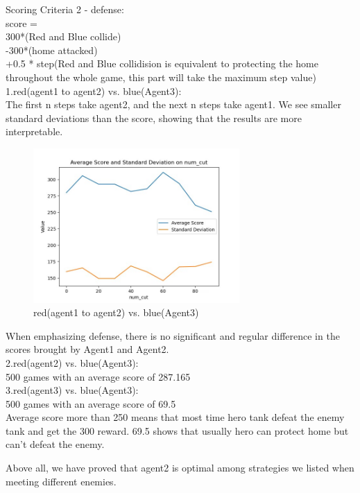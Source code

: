 \documentclass{article}
\begin{document}
Scoring Criteria 2 - defense:\\
score =\\
300*(Red and Blue collide)\\
-300*(home attacked)\\
+0.5 * step(Red and Blue collidision is equivalent to protecting the home throughout the whole game, this part will take the maximum step value) \\

1.red(agent1 to agent2) vs. blue(Agent3):\\
The first n steps take agent2, and the next n steps take agent1. We see smaller standard deviations than the score, showing that the results are more interpretable.\\
	\begin{figure}[H]
	\centering
	\includegraphics[width=0.7\textwidth]{r2.png}
	\caption{red(agent1 to agent2) vs. blue(Agent3)}
\end{figure} 
When emphasizing defense, there is no significant and regular difference in the scores brought by Agent1 and Agent2.\\

2.red(agent2) vs. blue(Agent3):\\
500 games with an average score of 287.165\\

3.red(agent3) vs. blue(Agent3):\\
500 games with an average score of 69.5\\

Average score more than 250 means that most time hero tank defeat the enemy tank and get the 300 reward. 69.5 shows that usually hero can protect home but can't defeat the enemy.

Above all, we have proved that agent2 is optimal among strategies we listed when meeting different enemies.
\end{document}
